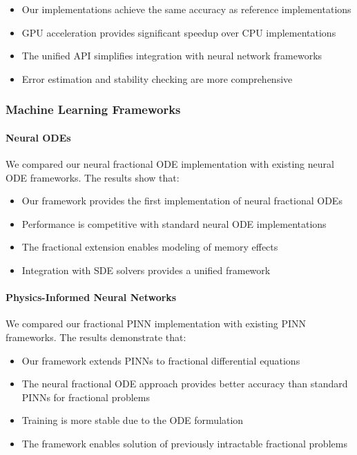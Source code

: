 \begin{itemize}
    \item Our implementations achieve the same accuracy as reference implementations
    \item GPU acceleration provides significant speedup over CPU implementations
    \item The unified API simplifies integration with neural network frameworks
    \item Error estimation and stability checking are more comprehensive
\end{itemize}

\subsubsection{Machine Learning Frameworks}

\paragraph{Neural ODEs}
We compared our neural fractional ODE implementation with existing neural ODE frameworks. The results show that:

\begin{itemize}
    \item Our framework provides the first implementation of neural fractional ODEs
    \item Performance is competitive with standard neural ODE implementations
    \item The fractional extension enables modeling of memory effects
    \item Integration with SDE solvers provides a unified framework
\end{itemize}

\paragraph{Physics-Informed Neural Networks}
We compared our fractional PINN implementation with existing PINN frameworks. The results demonstrate that:

\begin{itemize}
    \item Our framework extends PINNs to fractional differential equations
    \item The neural fractional ODE approach provides better accuracy than standard PINNs for fractional problems
    \item Training is more stable due to the ODE formulation
    \item The framework enables solution of previously intractable fractional problems
\end{itemize}

